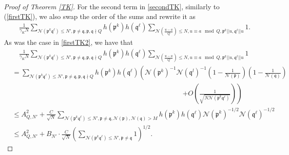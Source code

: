 \documentclass[11pt]{amsart}
\theoremstyle{definition}
\newcommand{\NN}{{\mathcal N}}
\newcommand{\Z}{{\mathbb Z}}
\newcommand{\mf}{\mathfrak}
\begin{document}
\begin{proof}[Proof of Theorem \ref{TK}]
For the second term in \eqref{secondTK}, similarly to (\ref{firstTK}), we also swap the order of the sums and rewrite it as
\begin{equation}\nonumber
    \begin{split}
        &\quad \frac{1}{\gamma_{K} N}\sum_{\NN(\mf p^{k}\mf q^{\ell}) \leq N', \mf p\neq \mf q,\mf p,\mf q\nmid Q} h(\mf p^{k})h(\mf q^{\ell})\sum_{\NN(\frac{u-a}{Q})\leq N, u\equiv a \mod Q, \mf p^{k}||u, \mf q^{\ell}||u}1.
    \end{split}
\end{equation}
As was the case in \eqref{firstTK2}, we have that
\begin{equation}\label{secondTK3}
    \begin{split}
        &\quad \frac{1}{\gamma_{K} N}\sum_{\NN(\mf p^{k}\mf q^{\ell}) \leq N', \mf p\neq \mf q,\mf p,\mf q\nmid Q} h(\mf p^{k})h(\mf q^{\ell})\sum_{\NN(\frac{u-a}{Q})\leq N, u\equiv a \mod Q, \mf p^{k}||u, \mf q^{\ell}||u}1
        \\&=\sum_{\NN(\mf p^{k}\mf q^{\ell})\leq N', \mf p\neq \mf q, \mf p,\mf q\nmid Q} h(\mf p^{k})h(\mf q^{\ell})\left(\NN(\mf p^k)^{-1}\NN(\mf q^l)^{-1}\left(1-\frac{1}{\NN(\mf p)}\right) \left(1-\frac{1}{\NN(\mf q)}\right)\right. \\&\quad\quad\quad\quad\quad\quad\quad\quad\quad\quad\quad\quad\quad\quad\quad\quad\quad\quad\quad\quad\quad\quad\quad\quad\quad\left.+O\left(\frac{1}{\sqrt{N\NN(\mf p^{k}\mf q^{\ell})}}\right)\right)
        \\&\leq A_{Q,N'}^{2}+\frac{C}{\sqrt{N}}\sum_{\NN(\mf p^{k}\mf q^{\ell})\leq N', \mf p\neq \mf q, \NN(\mf p),\NN(\mf q)>M} h(\mf p^{k})h(\mf q^{\ell})\NN(\mf p^{k})^{-1/2}\NN(\mf q^{\ell})^{-1/2}     %
        \\&\leq A_{Q,N'}^{2}+B_{N'}\cdot\frac{C}{\sqrt{N}}\left(\sum_{\NN(\mf p^{k}\mf q^{\ell})\leq N', \mf p\neq \mf q} 1\right)^{1/2}.
            \end{split}
\end{equation}


\end{proof}
\end{document}
